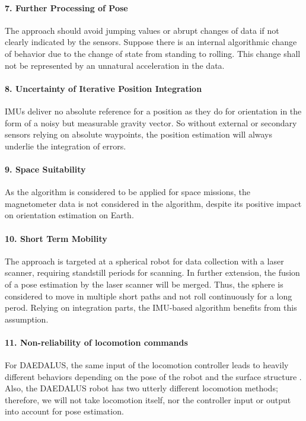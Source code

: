 \documentclass[letterpaper, 10 pt, conference]{ieeeconf}  %
\begin{document}
\paragraph*{7. Further Processing of Pose}
The approach should avoid jumping values or abrupt changes of data if not clearly indicated by the sensors. Suppose there is an internal algorithmic change of behavior due to the change of state from standing to rolling. This change shall not be represented by an unnatural acceleration in the data.
\paragraph*{8. Uncertainty of Iterative Position Integration}
IMUs deliver no absolute reference for a position as they do for orientation in the form of a noisy but measurable gravity vector. So without external or secondary sensors relying on absolute waypoints, the position estimation will always underlie the integration of errors.
\paragraph*{9. Space Suitability}
As the algorithm is considered to be applied for space missions, the magnetometer data is not considered in the algorithm, despite its positive impact on orientation estimation on Earth.
\paragraph*{10. Short Term Mobility}
The approach is targeted at a spherical robot for data collection with a laser scanner, requiring standstill periods for scanning.
In further extension, the fusion of a pose estimation by the laser scanner will be merged.
Thus, the sphere is considered to move in multiple short paths and not roll continuously for a long perod.
Relying on integration parts, the IMU-based algorithm benefits from this assumption.
\paragraph*{11. Non-reliability of locomotion commands}
For DAEDALUS, the same input of the locomotion controller leads to heavily different behaviors depending on the pose of the robot and the surface structure \cite{rossi2021daedalus}.
Also, the DAEDALUS robot has two utterly different locomotion methods; therefore, we will not take locomotion itself, nor the controller input or output into account for pose estimation.
\end{document}
